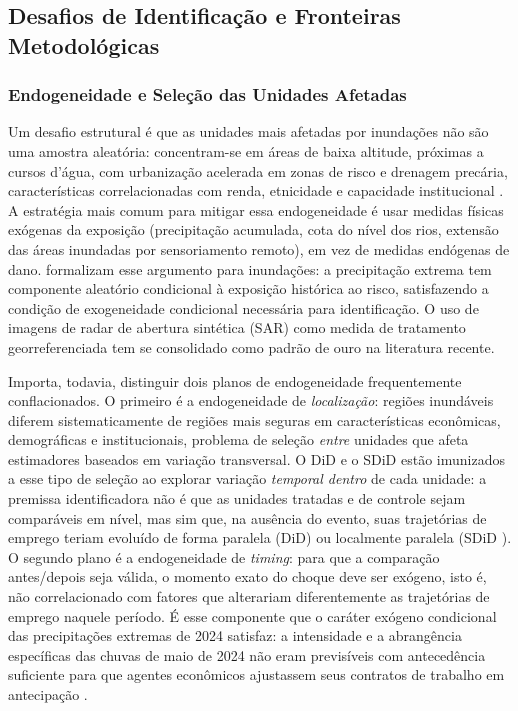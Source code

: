 \documentclass[a4paper,12pt]{article}
\begin{document}
\subsection{Desafios de Identificação e Fronteiras Metodológicas}
\label{sub:identificacao}

\subsubsection{Endogeneidade e Seleção das Unidades Afetadas}

Um desafio estrutural é que as unidades mais afetadas por inundações não são uma amostra
aleatória: concentram-se em áreas de baixa altitude, próximas a cursos d'água, com
urbanização acelerada em zonas de risco e drenagem precária, características
correlacionadas com renda, etnicidade e capacidade institucional
\cite{kahn2005death, rentschler2022}.
A estratégia mais
comum para mitigar essa endogeneidade é usar medidas físicas exógenas da exposição
(precipitação acumulada, cota do nível dos rios, extensão das áreas inundadas por
sensoriamento remoto), em vez de medidas endógenas de dano.
formalizam esse argumento para inundações: a precipitação extrema tem componente
aleatório condicional à exposição histórica ao risco, satisfazendo a condição de
exogeneidade condicional necessária para identificação. O uso de imagens de radar de
abertura sintética (SAR) como medida de tratamento georreferenciada tem se consolidado
como padrão de ouro na literatura recente.

Importa, todavia, distinguir dois planos de endogeneidade frequentemente conflacionados.
O primeiro é a endogeneidade de \emph{localização}: regiões inundáveis diferem
sistematicamente de regiões mais seguras em características econômicas, demográficas e
institucionais, problema de seleção \emph{entre} unidades que afeta estimadores
baseados em variação transversal. O DiD e o SDiD estão imunizados a esse tipo de
seleção ao explorar variação \emph{temporal dentro} de cada unidade: a premissa
identificadora não é que as unidades tratadas e de controle sejam comparáveis em
nível, mas sim que, na ausência do evento, suas trajetórias de emprego teriam evoluído
de forma paralela (DiD) ou localmente paralela (SDiD \cite{arkhangelsky2021}). O segundo
plano é a endogeneidade de \emph{timing}: para que a comparação antes/depois seja
válida, o momento exato do choque deve ser exógeno, isto é, não correlacionado com fatores
que alterariam diferentemente as trajetórias de emprego naquele período. É esse
componente que o caráter exógeno condicional das precipitações extremas de 2024 satisfaz:
a intensidade e a abrangência específicas das chuvas de maio de 2024 não eram
previsíveis com antecedência suficiente para que agentes econômicos ajustassem seus
contratos de trabalho em antecipação \cite{elsner2024}.
\end{document}
